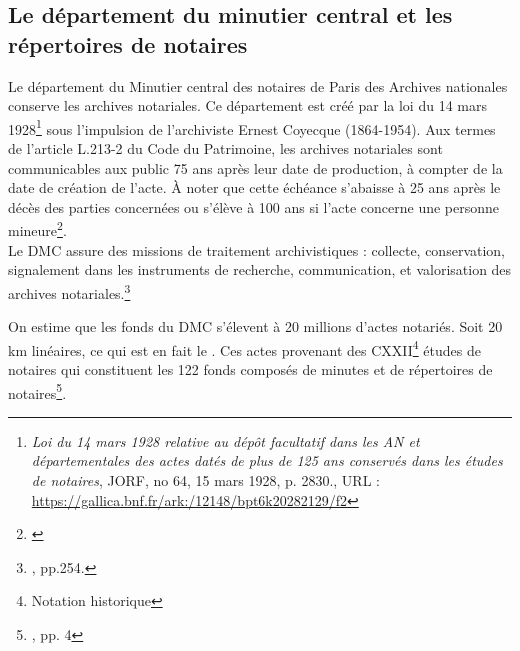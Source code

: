 \subsection{Le département du minutier central et les répertoires de notaires}

Le département du Minutier central des notaires de Paris des Archives nationales conserve les archives notariales. Ce département est créé par la loi du 14 mars 1928\footnote{\textit{Loi du 14 mars 1928 relative au dépôt facultatif dans les AN et départementales des actes datés de plus de 125 ans conservés dans les études de notaires}, JORF, no 64, 15 mars 1928, p. 2830., URL : \url{https://gallica.bnf.fr/ark:/12148/bpt6k20282129/f2}} sous l'impulsion de l'archiviste Ernest Coyecque (1864-1954). Aux termes de l'article L.213-2 du Code du Patrimoine, les archives notariales sont communicables aux public 75 ans après leur date de production, à compter de la date de création de l'acte. À noter que cette échéance s'abaisse à 25 ans après le décès des parties concernées ou s'élève à 100 ans si l'acte concerne une personne mineure\footnote{\cite{limon-bonnet_les_2013}}.\\

Le DMC assure des missions de traitement archivistiques : collecte, conservation, signalement dans les instruments de recherche, communication, et valorisation des archives notariales.\footnote{\cite{limon-bonnet_innovation_2019}, pp.254.}

On estime que les fonds du DMC s'élevent à 20 millions d'actes notariés. Soit 20 km linéaires, ce qui est en fait le . Ces actes provenant des CXXII\footnote{Notation historique} études de notaires qui constituent les 122 fonds composés de minutes et de répertoires de notaires\footnote{\cite{limon-bonnet_122_2012}, pp. 4}.\\

